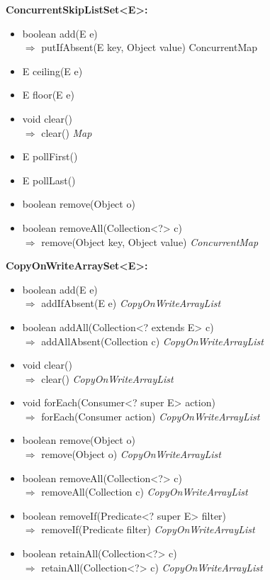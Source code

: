 \documentclass[]{usiinfthesis}
\begin{document}
{\noindent
\textbf{ConcurrentSkipListSet<E>:}
\begin{itemize}
    \item   boolean add(E e)
    \mbox{}\\ $\Rightarrow$      putIfAbsent(E key, Object value)		ConcurrentMap
    \item   E ceiling(E e)
    \item   E floor(E e)
    \item   void clear()
    \mbox{}\\ $\Rightarrow$   clear()							\textit{Map}
    \item   E pollFirst()
    \item   E pollLast()
    \item   boolean remove(Object o)
    \item   boolean removeAll(Collection<?> c)
    \mbox{}\\ $\Rightarrow$   remove(Object key, Object value)		\textit{ConcurrentMap}
\end{itemize}


\noindent
\textbf{CopyOnWriteArraySet<E>:}
\begin{itemize}
    \item   boolean add(E e)
     \mbox{}\\ $\Rightarrow$ addIfAbsent(E e)			    \textit{CopyOnWriteArrayList}
    \item   boolean addAll(Collection<? extends E> c)
     \mbox{}\\ $\Rightarrow$ addAllAbsent(Collection c)		    \textit{CopyOnWriteArrayList}
    \item   void clear()
     \mbox{}\\ $\Rightarrow$ clear()					    \textit{CopyOnWriteArrayList}
    \item   void forEach(Consumer<? super E> action)
     \mbox{}\\ $\Rightarrow$ forEach(Consumer action)		    \textit{CopyOnWriteArrayList}
    \item   boolean remove(Object o)
     \mbox{}\\ $\Rightarrow$ remove(Object o)			    \textit{CopyOnWriteArrayList}
    \item   boolean removeAll(Collection<?> c)	    
     \mbox{}\\ $\Rightarrow$ removeAll(Collection c)		    \textit{CopyOnWriteArrayList}
    \item   boolean removeIf(Predicate<? super E> filter)
     \mbox{}\\ $\Rightarrow$ removeIf(Predicate filter)		    \textit{CopyOnWriteArrayList}
    \item   boolean retainAll(Collection<?> c)
     \mbox{}\\ $\Rightarrow$ retainAll(Collection<?> c)		    \textit{CopyOnWriteArrayList}
\end{itemize}



}
\end{document}
